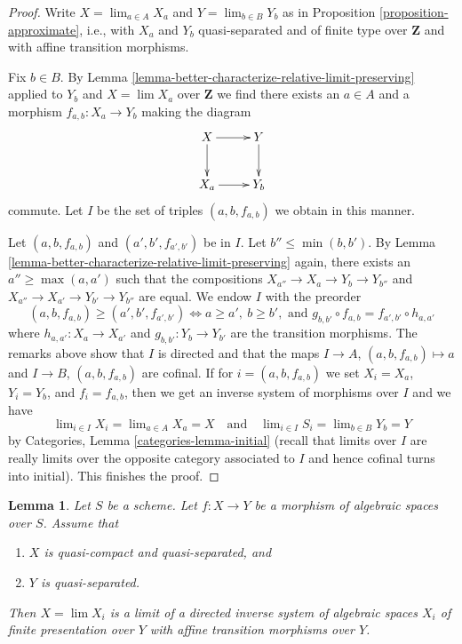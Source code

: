 \documentclass{stacks-project}
\theoremstyle{plain}
\newtheorem{lemma}[subsection]{Lemma}
\theoremstyle{definition}
\theoremstyle{remark}
\numberwithin{equation}{subsection}
\def\lim{\mathop{\mathrm{lim}}\nolimits}
\begin{document}
\begin{proof}
Write $X = \lim_{a \in A} X_a$ and $Y = \lim_{b \in B} Y_b$ as in
Proposition \ref{proposition-approximate}, i.e., with $X_a$ and $Y_b$
quasi-separated and of finite type over $\mathbf{Z}$ and
with affine transition morphisms.

\medskip\noindent
Fix $b \in B$.
By Lemma \ref{lemma-better-characterize-relative-limit-preserving}
applied to $Y_b$ and $X = \lim X_a$ over $\mathbf{Z}$
we find there exists an $a \in A$ and a morphism
$f_{a, b} : X_a \to Y_b$ making the diagram
$$
\xymatrix{
X \ar[d] \ar[r] & Y \ar[d] \\
X_a \ar[r] & Y_b
}
$$
commute. Let $I$ be the set of triples $(a, b, f_{a, b})$ we
obtain in this manner.

\medskip\noindent
Let $(a, b, f_{a, b})$ and $(a', b', f_{a', b'})$ be in $I$.
Let $b'' \leq \min(b, b')$. By
Lemma \ref{lemma-better-characterize-relative-limit-preserving}
again, there exists an $a'' \geq \max(a, a')$ such that
the compositions $X_{a''} \to X_a \to Y_b \to Y_{b''}$ and
$X_{a''} \to X_{a'} \to Y_{b'} \to Y_{b''}$ are equal.
We endow $I$ with the preorder
$$
(a, b, f_{a, b}) \geq (a', b', f_{a', b'})
\Leftrightarrow
a \geq a',\ b \geq b',\text{ and }
g_{b, b'} \circ f_{a, b} = f_{a', b'} \circ h_{a, a'}
$$
where $h_{a, a'} : X_a \to X_{a'}$ and $g_{b, b'} : Y_b \to Y_{b'}$
are the transition morphisms. The remarks above show that $I$
is directed and that the maps $I \to A$, $(a, b, f_{a, b}) \mapsto a$
and $I \to B$, $(a, b, f_{a, b})$ are cofinal. If for $i = (a, b, f_{a, b})$
we set $X_i = X_a$, $Y_i = Y_b$, and $f_i = f_{a, b}$, then we get
an inverse system of morphisms over $I$ and we have
$$
\lim_{i \in I} X_i = \lim_{a \in A} X_a = X
\quad\text{and}\quad
\lim_{i \in I} S_i = \lim_{b \in B} Y_b = Y
$$
by Categories, Lemma \ref{categories-lemma-initial} (recall that
limits over $I$ are really limits over the opposite category
associated to $I$ and hence cofinal turns into initial).
This finishes the proof.
\end{proof}

\begin{lemma}
\label{lemma-relative-approximation}
Let $S$ be a scheme. Let $f : X \to Y$ be a morphism of algebraic spaces
over $S$. Assume that
\begin{enumerate}
\item $X$ is quasi-compact and quasi-separated, and
\item $Y$ is quasi-separated.
\end{enumerate}
Then $X = \lim X_i$ is a limit of a directed inverse system of algebraic spaces
$X_i$ of finite presentation over $Y$ with affine transition morphisms
over $Y$.
\end{lemma}
\end{document}
